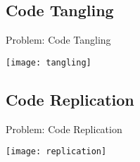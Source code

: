 \subsection{Code Tangling}
\begin{frame}{Problem: Code Tangling}
	\begin{center}
		\vspace{-2mm}
		\texttt{[image: tangling]}
	\end{center}
\end{frame}

\subsection{Code Replication}
\begin{frame}{Problem: Code Replication}
	\begin{center}
		\vspace{-2mm}
		\texttt{[image: replication]}
	\end{center}
\end{frame}